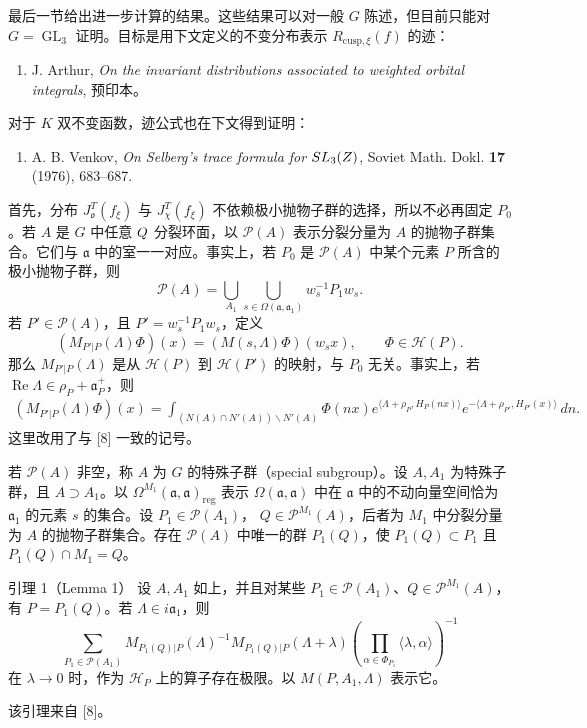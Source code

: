 最后一节给出进一步计算的结果。这些结果可以对一般 $G$ 陈述，但目前只能对
$G=\operatorname{GL}_3$ 证明。目标是用下文定义的不变分布表示
$R_{\mathrm{cusp},\xi}(f)$ 的迹：
\begin{enumerate}
\item[8.] J. Arthur, \emph{On the invariant distributions associated to weighted orbital integrals}, 预印本。
\end{enumerate}
对于 $K$ 双不变函数，迹公式也在下文得到证明：
\begin{enumerate}
\item[9.] A. B. Venkov, \emph{On Selberg's trace formula for $SL_3(Z)$}, Soviet Math. Dokl. \textbf{17} (1976), 683--687.
\end{enumerate}

首先，分布 $J_\mathfrak o^T(f_\xi)$ 与 $J_\chi^T(f_\xi)$ 不依赖极小抛物子群的选择，所以不必再固定 $P_0$。若 $A$ 是 $G$ 中任意 $Q$ 分裂环面，以
$\mathcal P(A)$ 表示分裂分量为 $A$ 的抛物子群集合。它们与 $\mathfrak a$ 中的室一一对应。事实上，若 $P_0$ 是 $\mathcal P(A)$ 中某个元素 $P$ 所含的极小抛物子群，则
\[
 \mathcal P(A)=\bigcup_{A_1}\bigcup_{s\in\Omega(\mathfrak a,\mathfrak a_1)}w_s^{-1}P_1w_s.
\]
若 $P'\in\mathcal P(A)$，且 $P'=w_s^{-1}P_1w_s$，定义
\[
 (M_{P'|P}(\Lambda)\Phi)(x)=(M(s,\Lambda)\Phi)(w_sx),\qquad\Phi\in\mathcal H(P).
\]
那么 $M_{P'|P}(\Lambda)$ 是从 $\mathcal H(P)$ 到 $\mathcal H(P')$ 的映射，与 $P_0$ 无关。事实上，若
$\operatorname{Re}\Lambda\in\rho_P+\mathfrak a_P^+$，则
\begin{equation}
\begin{split}
 (M_{P'|P}(\Lambda)\Phi)(x)
 =\int_{(N(A)\cap N'(A))\backslash N'(A)}
 \Phi(nx)e^{\langle\Lambda+\rho_P,H_P(nx)\rangle}
 e^{-\langle\Lambda+\rho_{P'},H_{P'}(x)\rangle}\,dn.
\end{split}\tag{1}
\end{equation}
这里改用了与 [8] 一致的记号。

若 $\mathcal P(A)$ 非空，称 $A$ 为 $G$ 的特殊子群（special subgroup）。设 $A,A_1$ 为特殊子群，且 $A\supset A_1$。以
$\Omega^{M_1}(\mathfrak a,\mathfrak a)_{\mathrm{reg}}$ 表示
$\Omega(\mathfrak a,\mathfrak a)$ 中在 $\mathfrak a$ 中的不动向量空间恰为 $\mathfrak a_1$ 的元素 $s$ 的集合。设 $P_1\in\mathcal P(A_1)$，
$Q\in\mathcal P^{M_1}(A)$，后者为 $M_1$ 中分裂分量为 $A$ 的抛物子群集合。存在
$\mathcal P(A)$ 中唯一的群 $P_1(Q)$，使 $P_1(Q)\subset P_1$ 且 $P_1(Q)\cap M_1=Q$。

\begin{originaltheorem}{引理 1（Lemma 1）}
设 $A,A_1$ 如上，并且对某些 $P_1\in\mathcal P(A_1)$、$Q\in\mathcal P^{M_1}(A)$，有
$P=P_1(Q)$。若 $\Lambda\in i\mathfrak a_1$，则
\[
 \sum_{P_1\in\mathcal P(A_1)}
 M_{P_1(Q)|P}(\Lambda)^{-1}M_{P_1(Q)|P}(\Lambda+\lambda)
 \left(\prod_{\alpha\in\Phi_{P_1}}\langle\lambda,\alpha\rangle\right)^{-1}
\]
在 $\lambda\to0$ 时，作为 $\mathcal H_P$ 上的算子存在极限。以 $M(P,A_1,\Lambda)$ 表示它。
\end{originaltheorem}
该引理来自 [8]。


